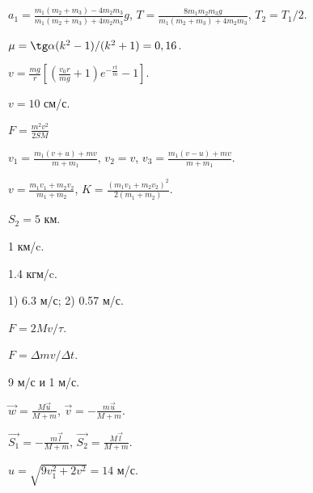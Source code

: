 \begin{Answer}{77}
$a_1 = \frac{m_1(m_2+m_3)-4m_2m_3}{m_1(m_2+m_3)+4m_2m_3}g$, $T= \frac{8m_1m_2m_3g}{m_1(m_2+m_3)+4m_2m_3}$, $T_2 = T_1/2$.
\end{Answer}
\begin{Answer}{78}
$\mu = \tg \alpha (k^2-1)/(k^2+1) = 0,16$.
\end{Answer}
\begin{Answer}{79}
$v = \frac{mg}{r}\left[ \left( \frac{v_0r}{mg} +1 \right)e^{-\frac{rt}{m}} - 1 \right]$.
\end{Answer}
\begin{Answer}{80}
$v=10$ см/с.
\end{Answer}
\begin{Answer}{81}
$F = \frac{m^2 v^2}{2SM}$
\end{Answer}
\begin{Answer}{82}
$v_1 = \frac{m_1(v+u)+mv}{m+m_1}$, $v_2 = v$, $v_3 = \frac{m_1(v-u)+mv}{m+m_1}$.
\end{Answer}
\begin{Answer}{83}
$v = \frac{m_1v_1 + m_2v_2}{m_1+m_2}$, $K = \frac{(m_1v_1+m_2v_2)^2}{2(m_1+m_2)}$.
\end{Answer}
\begin{Answer}{84}
$S_2 = 5$ км.
\end{Answer}
\begin{Answer}{89}
1 км/c.
\end{Answer}
\begin{Answer}{90}
1.4 кгм/c.
\end{Answer}
\begin{Answer}{91}
1) 6.3 м/с; 2) 0.57 м/с.
\end{Answer}
\begin{Answer}{92}
$F = 2Mv/\tau$.
\end{Answer}
\begin{Answer}{93}
$F = \Delta m v/ \Delta t$.
\end{Answer}
\begin{Answer}{94}
9 м/с и 1 м/с.
\end{Answer}
\begin{Answer}{95}
$\vec{w} = \frac{M\vec{u}}{M+m}$, $\vec{v} = -\frac{m\vec{u}}{M+m}$.
\end{Answer}
\begin{Answer}{96}
$\vec{S_1} = -\frac{m\vec{l}}{M+m}$, $\vec{S_2} = \frac{M\vec{l}}{M+m}$.
\end{Answer}
\begin{Answer}{97}
$u = \sqrt{9v_{1}^2 + 2v^2} = 14$ м/с.
\end{Answer}
